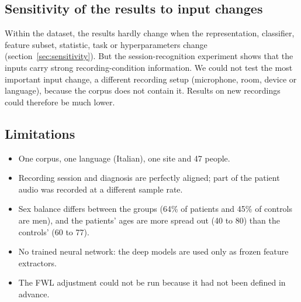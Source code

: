 \documentclass[11pt,a4paper]{article}
\begin{document}
\subsection{Sensitivity of the results to input changes}
Within the dataset, the results hardly change when the representation, classifier, feature subset, statistic, task or hyperparameters change (section~\ref{sec:sensitivity}). But the session-recognition experiment shows that the inputs carry strong recording-condition information. We could not test the most important input change, a different recording setup (microphone, room, device or language), because the corpus does not contain it. Results on new recordings could therefore be much lower.

\subsection{Limitations}
\begin{itemize}\item One corpus, one language (Italian), one site and 47 people.
\item Recording session and diagnosis are perfectly aligned; part of the patient audio was recorded at a different sample rate.
\item Sex balance differs between the groups (64\% of patients and 45\% of controls are men), and the patients' ages are more spread out (40 to 80) than the controls' (60 to 77).
\item No trained neural network: the deep models are used only as frozen feature extractors.
\item The FWL adjustment could not be run because it had not been defined in advance.
\end{itemize}
\end{document}
